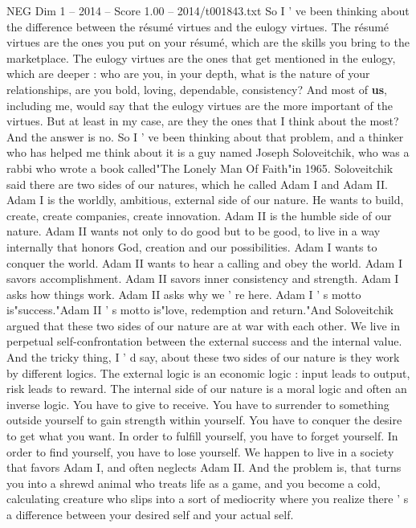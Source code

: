 \begin{textsample}{NEG Dim 1 – 2014 – Score 1.00 – 2014/t001843.txt}  \label{ex:f1_neg_036}
So I ' ve been thinking about the difference between the résumé virtues and the eulogy virtues.
The résumé virtues are the ones you put on your résumé, which are the skills you bring to the marketplace.
The eulogy virtues are the ones that get mentioned in the eulogy, which are deeper : who are you, in your depth, what is the nature of your relationships, are you bold, loving, dependable, consistency?
And most of \textbf{us}, including me, would say that the eulogy virtues are the more important of the virtues.
But at least in my case, are they the ones that I think about the most?
And the answer is no.
So I ' ve been thinking about that problem, and a thinker who has helped me think about it is a guy named Joseph Soloveitchik, who was a rabbi who wrote a book called"The Lonely Man Of Faith"in 1965.
Soloveitchik said there are two sides of our natures, which he called Adam I and Adam II.
Adam I is the worldly, ambitious, external side of our nature.
He wants to build, create, create companies, create innovation.
Adam II is the humble side of our nature.
Adam II wants not only to do good but to be good, to live in a way internally that honors God, creation and our possibilities.
Adam I wants to conquer the world.
Adam II wants to hear a calling and obey the world.
Adam I savors accomplishment.
Adam II savors inner consistency and strength.
Adam I asks how things work.
Adam II asks why we ' re here.
Adam I ' s motto is"success."Adam II ' s motto is"love, redemption and return."And Soloveitchik argued that these two sides of our nature are at war with each other.
We live in perpetual self-confrontation between the external success and the internal value.
And the tricky thing, I ' d say, about these two sides of our nature is they work by different logics.
The external logic is an economic logic : input leads to output, risk leads to reward.
The internal side of our nature is a moral logic and often an inverse logic.
You have to give to receive.
You have to surrender to something outside yourself to gain strength within yourself.
You have to conquer the desire to get what you want.
In order to fulfill yourself, you have to forget yourself.
In order to find yourself, you have to lose yourself.
We happen to live in a society that favors Adam I, and often neglects Adam II.
And the problem is, that turns you into a shrewd animal who treats life as a game, and you become a cold, calculating creature who slips into a sort of mediocrity where you realize there ' s a difference between your desired self and your actual self.

\end{textsample}
